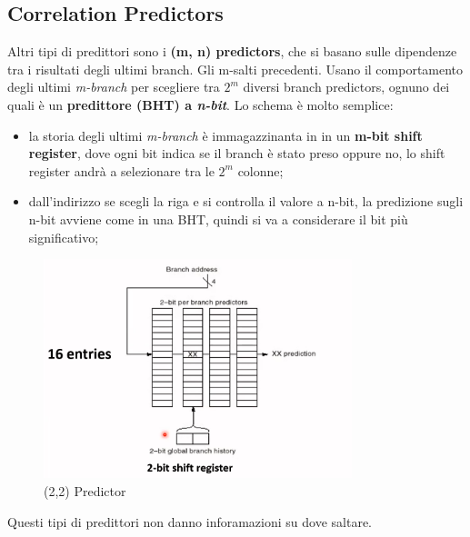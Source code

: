 \documentclass[12pt]{article}
\begin{document}
\subsection{Correlation Predictors}
Altri tipi di predittori sono i \textbf{(m, n) predictors}, che si basano sulle dipendenze tra i risultati degli ultimi branch. Gli m-salti precedenti. Usano il comportamento degli ultimi \emph{m-branch} per scegliere tra $2^m$ diversi branch predictors, ognuno dei quali \`e un \textbf{predittore (BHT) a \emph{n-bit}}. Lo schema \`e molto semplice:
\begin{itemize}
    \item la storia degli ultimi \emph{m-branch} \`e immagazzinanta in in un \textbf{m-bit shift register}, dove ogni bit indica se il branch \`e stato preso oppure no, lo shift register andr\`a a selezionare tra le $2^m$ colonne;
    \item dall'indirizzo se scegli la riga e si controlla il valore a n-bit, la predizione sugli n-bit avviene come in una BHT, quindi si va a considerare il bit pi\`u significativo;
\end{itemize}
\begin{figure}[H]
    \centering
    \includegraphics[width=0.8\textwidth]{predictor.png}
    \caption{(2,2) Predictor}
    \label{fig:predictor}
\end{figure}
Questi tipi di predittori non danno inforamazioni su dove saltare.
\end{document}
